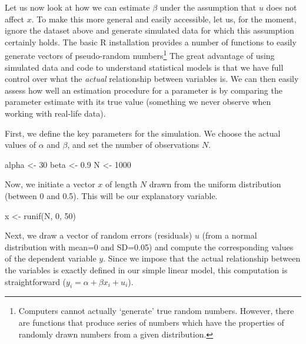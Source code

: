 \documentclass[
  12pt,
]{style/krantz}
\newenvironment{Shaded}{\begin{snugshade}}{\end{snugshade}}
\newcommand{\DecValTok}[1]{\textcolor[rgb]{0.00,0.00,0.81}{#1}}
\newcommand{\FloatTok}[1]{\textcolor[rgb]{0.00,0.00,0.81}{#1}}
\newcommand{\FunctionTok}[1]{\textcolor[rgb]{0.00,0.00,0.00}{#1}}
\newcommand{\NormalTok}[1]{#1}
\newcommand{\OtherTok}[1]{\textcolor[rgb]{0.56,0.35,0.01}{#1}}
\begin{document}
Let us now look at how we can estimate \(\beta\) under the assumption that \(u\) does not affect \(x\). To make this more general and easily accessible, let us, for the moment, ignore the dataset above and generate simulated data for which this assumption certainly holds. The basic R installation provides a number of functions to easily generate vectors of pseudo-random numbers\footnote{Computers cannot actually `generate' true random numbers. However, there are functions that produce series of numbers which have the properties of randomly drawn numbers from a given distribution.} The great advantage of using simulated data and code to understand statistical models is that we have full control over what the \emph{actual} relationship between variables is. We can then easily assess how well an estimation procedure for a parameter is by comparing the parameter estimate with its true value (something we never observe when working with real-life data).

First, we define the key parameters for the simulation. We choose the actual values of \(\alpha\) and \(\beta\), and set the number of observations \(N\).

\begin{Shaded}
\begin{Highlighting}[]
\NormalTok{alpha }\OtherTok{\textless{}{-}} \DecValTok{30}
\NormalTok{beta }\OtherTok{\textless{}{-}} \FloatTok{0.9}
\NormalTok{N }\OtherTok{\textless{}{-}} \DecValTok{1000}
\end{Highlighting}
\end{Shaded}

Now, we initiate a vector \(x\) of length \(N\) drawn from the uniform distribution (between 0 and 0.5). This will be our explanatory variable.

\begin{Shaded}
\begin{Highlighting}[]
\NormalTok{x }\OtherTok{\textless{}{-}} \FunctionTok{runif}\NormalTok{(N, }\DecValTok{0}\NormalTok{, }\DecValTok{50}\NormalTok{)}
\end{Highlighting}
\end{Shaded}

Next, we draw a vector of random errors (residuals) \(u\) (from a normal distribution with mean=0 and SD=0.05) and compute the corresponding values of the dependent variable \(y\). Since we impose that the actual relationship between the variables is exactly defined in our simple linear model, this computation is straightforward (\(y_{i}= \alpha + \beta x_{i} + u_{i}\)).
\end{document}
